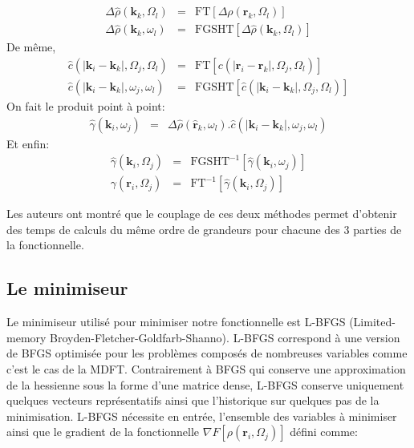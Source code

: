 \begin{eqnarray}
\Delta\hat{\rho}\left(\boldsymbol{k}_k,\Omega_l\right) &=& \mathrm{FT}[\Delta\rho\left(\boldsymbol{r}_k,\Omega_l\right)] \\
\Delta\hat{\rho}\left(\boldsymbol{k}_k,\omega_l\right) &=& \mathrm{FGSHT}[\Delta\hat{\rho}\left(\boldsymbol{k}_k,\Omega_l\right)]
\end{eqnarray}
De même,
\begin{eqnarray}
\hat{c}\left( \left|\boldsymbol{k}_i-\boldsymbol{k}_k\right|,\Omega_j,\Omega_l \right) &=& \mathrm{FT}[c\left( \left|\boldsymbol{r}_i-\boldsymbol{r}_k\right|,\Omega_j,\Omega_l \right)] \\
\hat{c}\left( \left|\boldsymbol{k}_i-\boldsymbol{k}_k\right|,\omega_j,\omega_l \right) &=& \mathrm{FGSHT}[\hat{c}\left( 
\left|\boldsymbol{k}_i-\boldsymbol{k}_k\right|,\Omega_j,\Omega_l \right)]
\end{eqnarray}
On fait le produit point à point:
\begin{eqnarray}
\hat{\gamma}(\boldsymbol{k}_i,\omega_j) &=& \Delta\hat{\rho}\left(\boldsymbol{\hat{r}}_k,\omega_l\right) . \hat{c}\left( \left|\boldsymbol{k}_i-\boldsymbol{k}_k\right|,\omega_j,\omega_l \right)
\end{eqnarray}
Et enfin:
\begin{eqnarray}
\hat{\gamma}(\boldsymbol{k}_i,\Omega_j) &=& \mathrm{FGSHT}^{-1}[\hat{\gamma}(\boldsymbol{k}_i,\omega_j)]\\
\gamma(\boldsymbol{r}_i,\Omega_j) &=& \mathrm{FT}^{-1}[\hat{\gamma}(\boldsymbol{k}_i,\Omega_j)]
\end{eqnarray}

Les auteurs\cite{ding_thesis} ont montré que le couplage de ces deux méthodes permet d'obtenir des temps de calculs du même ordre de grandeurs pour chacune des 3 parties de la fonctionnelle. 


\subsection{Le minimiseur}
Le minimiseur utilisé pour minimiser notre fonctionnelle est L-BFGS (Limited-memory Broyden-Fletcher-Goldfarb-Shanno)\cite{Byrd_lbfgs_1995}. L-BFGS correspond à une version de BFGS\cite{bfgs_2006} optimisée pour les problèmes composés de nombreuses variables comme c'est le cas de la MDFT. Contrairement à BFGS qui conserve une approximation de la hessienne sous la forme d'une matrice dense, L-BFGS conserve uniquement quelques vecteurs représentatifs ainsi que l'historique sur quelques pas de la minimisation. L-BFGS nécessite en entrée, l'ensemble des variables à minimiser ainsi que le gradient de la fonctionnelle $\nabla F[\rho\left(\boldsymbol{r}_i,\Omega_j\right)]$ défini comme:


